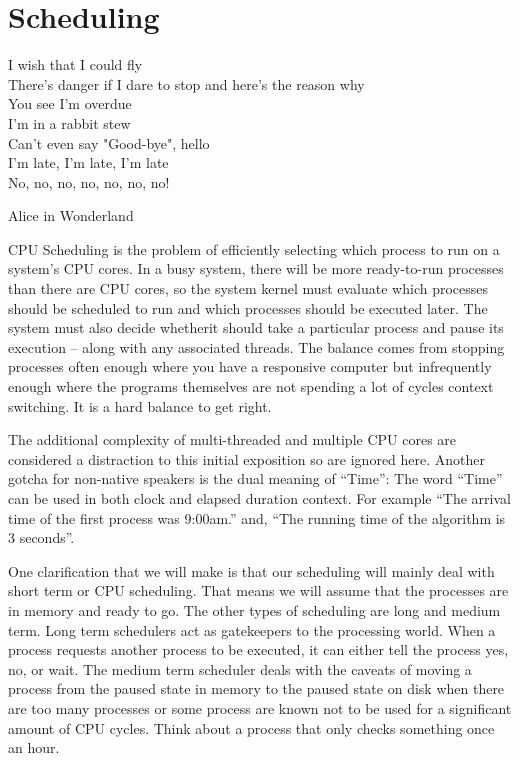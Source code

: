 \chapter{Scheduling}

\epigraph{I wish that I could fly\\
There's danger if I dare to stop and here's the reason why\\
You see I'm overdue\\
I'm in a rabbit stew\\
Can't even say "Good-bye", hello\\
I'm late, I'm late, I'm late\\
No, no, no, no, no, no, no!}{Alice in Wonderland}

CPU Scheduling is the problem of efficiently selecting which process to run on a system's CPU cores.
In a busy system, there will be more ready-to-run processes than there are CPU cores, so the system kernel must evaluate which processes should be scheduled to run and which processes should be executed later.
The system must also decide whetherit should take a particular process and pause its execution -- along with any associated threads.
The balance comes from stopping processes often enough where you have a responsive computer but infrequently enough where the programs themselves are not spending a lot of cycles context switching.
It is a hard balance to get right.

The additional complexity of multi-threaded and multiple CPU cores are considered a distraction to this initial exposition so are ignored here.
Another gotcha for non-native speakers is the dual meaning of ``Time'': The word ``Time'' can be used in both clock and elapsed duration context.
For example ``The arrival time of the first process was 9:00am.'' and, ``The running time of the algorithm is 3 seconds''.

One clarification that we will make is that our scheduling will mainly deal with short term or CPU scheduling.
That means we will assume that the processes are in memory and ready to go.
The other types of scheduling are long and medium term.
Long term schedulers act as gatekeepers to the processing world.
When a process requests another process to be executed, it can either tell the process yes, no, or wait.
The medium term scheduler deals with the caveats of moving a process from the paused state in memory to the paused state on disk when there are too many processes or some process are known not to be used for a significant amount of CPU cycles.
Think about a process that only checks something once an hour.

